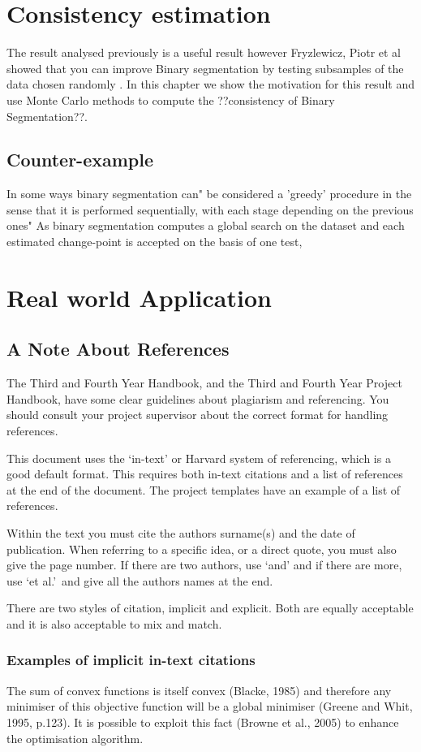 \documentclass[a4paper, 12pt, notitlepage]{report}
\begin{document}
\chapter{Consistency estimation}
%
The result analysed previously is a useful result however Fryzlewicz, Piotr et al showed that you can improve Binary segmentation by testing subsamples of the data chosen randomly%
. In this chapter we show the motivation for this result and use Monte Carlo methods to compute the ??consistency of Binary Segmentation??. %
\section{Counter-example}
%
In some ways binary segmentation can" be considered a 'greedy' procedure in the sense that it is performed sequentially, with each stage depending on the previous ones"%
As binary segmentation computes a global search on the dataset and each estimated change-point is accepted on the basis of one test, 
\chapter{Real world Application}
\section{A Note About References}
%
The Third and Fourth Year Handbook, and the Third and Fourth Year Project Handbook, have some clear guidelines about plagiarism and referencing.
You should consult your project supervisor about the correct format for handling references.

This document uses the `in-text' or Harvard system of referencing, which is a good default format.
This requires both in-text citations and a list of references at the end of the document.
The project templates have an example of a list of references.

Within the text you must cite the authors surname(s) and the date of publication.
When referring to a specific idea, or a direct quote, you must also give the page number.
If there are two authors, use `and' and if there are more, use `et al.'\ and give all the authors names at the end.

There are two styles of citation, implicit and explicit.
Both are equally acceptable and it is also acceptable to mix and match.

\subsection{Examples of implicit in-text citations}
%
The sum of convex functions is itself convex (Blacke, 1985) and therefore any minimiser of this objective function will be a global minimiser (Greene and Whit, 1995, p.123). It is possible to exploit this fact (Browne et al., 2005) to enhance the optimisation algorithm.
\end{document}
